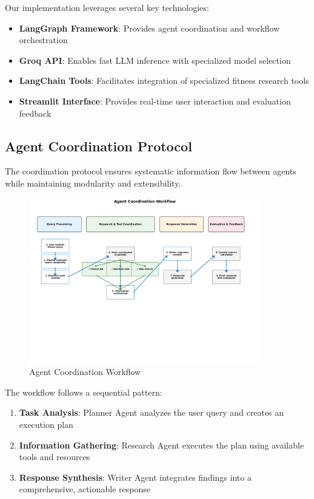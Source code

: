 \documentclass[conference]{IEEEtran}
\begin{document}
Our implementation leverages several key technologies:

\begin{itemize}
\item \textbf{LangGraph Framework}: Provides agent coordination and workflow orchestration
\item \textbf{Groq API}: Enables fast LLM inference with specialized model selection
\item \textbf{LangChain Tools}: Facilitates integration of specialized fitness research tools
\item \textbf{Streamlit Interface}: Provides real-time user interaction and evaluation feedback
\end{itemize}

\subsection{Agent Coordination Protocol}

The coordination protocol ensures systematic information flow between agents while maintaining modularity and extensibility. 

\begin{figure}[htbp]
\centering
\includegraphics[width=0.9\textwidth]{diagrams/coordination_workflow.png}
\caption{Agent Coordination Workflow}
\label{fig:workflow}
\end{figure}

The workflow follows a sequential pattern:

\begin{enumerate}
\item \textbf{Task Analysis}: Planner Agent analyzes the user query and creates an execution plan
\item \textbf{Information Gathering}: Research Agent executes the plan using available tools and resources
\item \textbf{Response Synthesis}: Writer Agent integrates findings into a comprehensive, actionable response
\end{enumerate}
\end{document}
